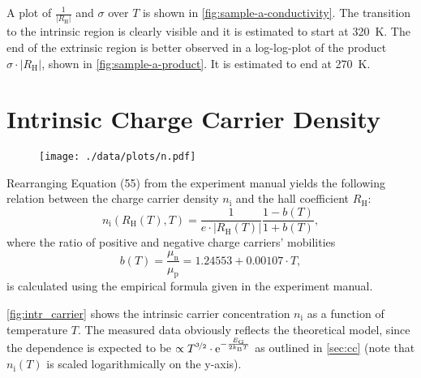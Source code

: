 A plot of $\frac{1}{\left|R_\text{H}\right|}$ and $\sigma$ over $T$ is shown in \autoref{fig:sample-a-conductivity}.
The transition to the intrinsic region is clearly visible and it is estimated to start at \SI{320}{\kelvin}.
The end of the extrinsic region is better observed in a log-log-plot of the product $\sigma \cdot \left| R_\text{H} \right|$, shown in \autoref{fig:sample-a-product}.
It is estimated to end at \SI{270}{\kelvin}.


\section{Intrinsic Charge Carrier Density}
\begin{figure}
	\centering
	\texttt{[image: ./data/plots/n.pdf]}
	\label{fig:intr_carrier}
\end{figure}

Rearranging Equation (55) from the experiment manual yields the following relation between the charge carrier density $n_\text{i}$ and the hall coefficient $R_\text{H}$:
\begin{equation*}
	n_\text{i} \left(R_\text{H}\left( T \right), T \right) = \frac{1}{e \cdot \left|R_\text{H}\left(T\right)\right|} \frac{ 1 - b \left( T \right) }{ 1 + b \left( T \right) },
\end{equation*}
where the ratio of positive and negative charge carriers' mobilities
\begin{equation*}
	b \left( T \right) = \frac{\mu_\text{n}}{\mu_\text{p}} = \num{1.24553} + \num{0.00107} \cdot T,
\end{equation*}
is calculated using the empirical formula given in the experiment manual.

\autoref{fig:intr_carrier} shows the intrinsic carrier concentration $n_\text{i}$ as a function of temperature $T$.
The measured data obviously reflects the theoretical model, since the dependence is expected to be $\propto T^{\nicefrac{3}{2}}\cdot\mathrm{e}^{-\frac{E_\text{G}}{2k_\text{B}T}}$ as outlined in \autoref{sec:cc} (note that $n_\text{i}(T)$ is scaled logarithmically on the y-axis).

